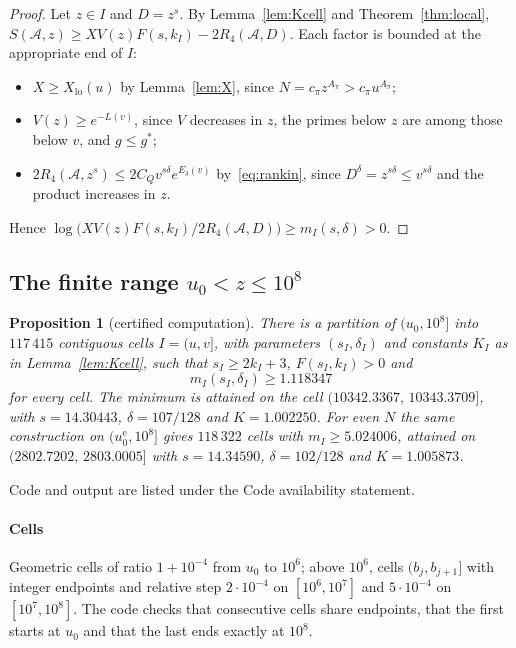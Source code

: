 \documentclass[preprint,11pt]{elsarticle}
\newtheorem{proposition}[theorem]{Proposition}
\theoremstyle{definition}
\theoremstyle{remark}
\newcommand{\cA}{\mathcal{A}}
\numberwithin{equation}{section}
\begin{document}
\begin{proof}
Let $z\in I$ and $D=z^s$. By Lemma~\ref{lem:Kcell} and
Theorem~\ref{thm:local}, $S(\cA,z)\ge XV(z)F(s,k_I)-2R_4(\cA,D)$. Each factor
is bounded at the appropriate end of $I$:
\begin{itemize}
\item $X\ge X_{\mathrm{lo}}(u)$ by Lemma~\ref{lem:X}, since
  $N=c_\pi z^{A_\pi}>c_\pi u^{A_\pi}$;
\item $V(z)\ge e^{-L(v)}$, since $V$ decreases in $z$, the primes below $z$
  are among those below $v$, and $g\le g^*$;
\item $2R_4(\cA,z^s)\le2C_Qv^{s\delta}e^{E_\delta(v)}$ by~\eqref{eq:rankin},
  since $D^\delta=z^{s\delta}\le v^{s\delta}$ and the product increases in
  $z$.
\end{itemize}
Hence $\log\bigl(XV(z)F(s,k_I)/2R_4(\cA,D)\bigr)\ge m_I(s,\delta)>0$.
\end{proof}

\subsection{\texorpdfstring{The finite range $u_0<z\le10^8$}{The finite range}}

\begin{proposition}[certified computation]\label{prop:finite}
There is a partition of $(u_0,10^8]$ into $117\,415$ contiguous cells
$I=(u,v]$, with parameters $(s_I,\delta_I)$ and constants $K_I$ as in
Lemma~\ref{lem:Kcell}, such that $s_I\ge2k_I+3$, $F(s_I,k_I)>0$ and
\[
  m_I(s_I,\delta_I)\ge 1.118347
\]
for every cell. The minimum is attained on the cell
$(10342.3367,\,10343.3709]$, with $s=14.30443$, $\delta=107/128$ and
$K=1.002250$. For even $N$ the same construction on $(u_0^{\mathrm{e}},10^8]$
gives $118\,322$ cells with $m_I\ge5.024006$, attained on
$(2802.7202,\,2803.0005]$ with $s=14.34590$, $\delta=102/128$ and
$K=1.005873$.
\end{proposition}

Code and output are listed under the Code availability statement.

\paragraph{Cells}
Geometric cells of ratio $1+10^{-4}$ from $u_0$ to $10^6$; above $10^6$,
cells $(b_j,b_{j+1}]$ with integer endpoints and relative step
$2\cdot10^{-4}$ on $[10^6,10^7]$ and $5\cdot10^{-4}$ on $[10^7,10^8]$. The
code checks that consecutive cells share endpoints, that the first starts
at $u_0$ and that the last ends exactly at $10^8$.
\end{document}
